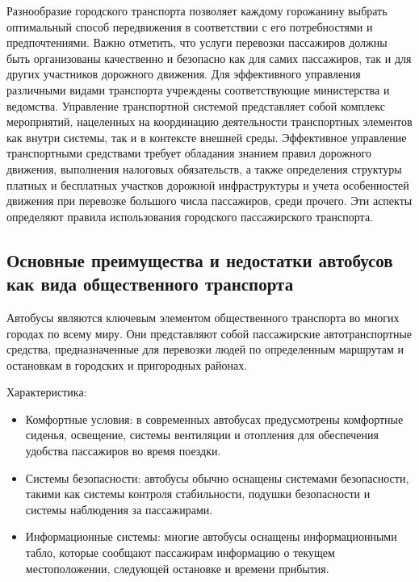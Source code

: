 Разнообразие городского транспорта позволяет каждому горожанину выбрать оптимальный способ передвижения в соответствии с его потребностями и предпочтениями. Важно отметить, что услуги перевозки пассажиров должны быть организованы качественно и безопасно как для самих пассажиров, так и для других участников дорожного движения.
Для эффективного управления различными видами транспорта учреждены соответствующие министерства и ведомства. Управление транспортной системой представляет собой комплекс мероприятий, нацеленных на координацию деятельности транспортных элементов как внутри системы, так и в контексте внешней среды. Эффективное управление транспортными средствами требует обладания знанием правил дорожного движения, выполнения налоговых обязательств, а также определения структуры платных и бесплатных участков дорожной инфраструктуры и учета особенностей движения при перевозке большого числа пассажиров, среди прочего. Эти аспекты определяют правила использования городского пассажирского транспорта.

\subsection{Основные преимущества и недостатки автобусов как вида общественного транспорта}

Автобусы являются ключевым элементом общественного транспорта во многих городах по всему миру. Они представляют собой пассажирские автотранспортные средства, предназначенные для перевозки людей по определенным маршрутам и остановкам в городских и пригородных районах.

 Характеристика:
\begin{itemize}
	\item Комфортные условия: в современных автобусах предусмотрены комфортные сиденья, освещение, системы вентиляции и отопления для обеспечения удобства пассажиров во время поездки.
	\item Системы безопасности: автобусы обычно оснащены системами безопасности, такими как системы контроля стабильности, подушки безопасности и системы наблюдения за пассажирами.
	\item Информационные системы: многие автобусы оснащены информационными табло, которые сообщают пассажирам информацию о текущем местоположении, следующей остановке и времени прибытия.

\end{itemize}

